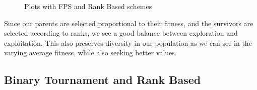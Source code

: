 \documentclass{article}
\theoremstyle{mytheoremstyle}
\theoremstyle{mytheoremstyle}
\theoremstyle{myproblemstyle}
\begin{document}
\begin{figure}[H]
\begin{tabular}{| c | c |}
    \end{tabular}
    \begin{center}
        \caption{Plots with FPS and Rank Based schemes}
    \end{center}
\end{figure}

Since our parents are selected proportional to their fitness, and the survivors are selected according to ranks, we see a good balance between exploration and exploitation. This also preserves diversity in our population as we can see in the varying average fitness, while also seeking better values.

\subsection{Binary Tournament and Rank Based}
\end{document}
